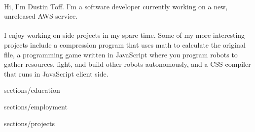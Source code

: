 \customHeader [
    firstName = Dustin,
    lastName = Toff,
    email = me@dustintoff.com,
    phone = +1 (724) 638-7893,
    website = dustintoff.com,
    websiteLink = http://dustintoff.com,
    githubUser = quittle,
]

\parbox {\textwidth} {}

\vfill

\begin {minipage} {\textwidth}
    ~\\
    Hi, I'm Dustin Toff. I'm a software developer currently working on a new, unreleased AWS service.
    \\~\\
    I enjoy working on side projects in my spare time. Some of my more interesting projects include a compression program that uses math to calculate the original file, a programming game written in JavaScript where you program robots to gather resources, fight, and build other robots autonomously, and a CSS compiler that runs in JavaScript client side.
\end {minipage}

 { {sections/education}}

 { {sections/employment}}

 { {sections/projects}}
